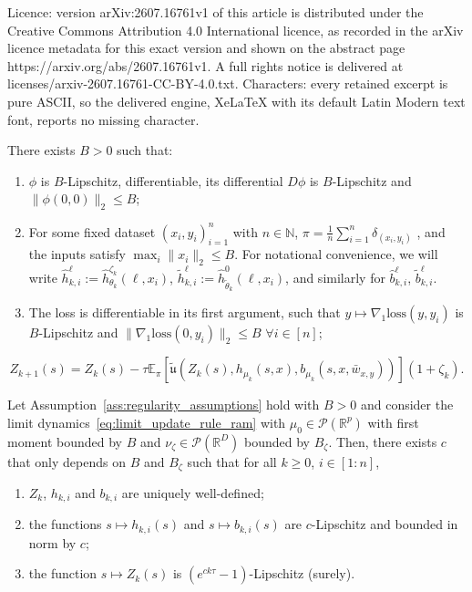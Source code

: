 \documentclass[10pt,a4paper]{amsart}
\newcommand{\E}{\mathbb{E}}
\newcommand{\R}{\mathbb{R}}
\begin{document}
Licence: version arXiv:2607.16761v1 of this article is distributed under the Creative Commons Attribution 4.0 International licence, as recorded in the arXiv licence metadata for this exact version and shown on the abstract page https://arxiv.org/abs/2607.16761v1. A full rights notice is delivered at licenses/arxiv-2607.16761-CC-BY-4.0.txt. Characters: every retained excerpt is pure ASCII, so the delivered engine, XeLaTeX with its default Latin Modern text font, reports no missing character.
\begin{assumption}\label{ass:regularity_assumptions}
    There exists $B > 0$ such that:
\begin{enumerate}
    \item $\phi$ is $B$-Lipschitz, differentiable, its differential $D\phi$ is $B$-Lipschitz and $\|\phi(0,0)\|_2 \le B$;
    \item For some fixed dataset ${(x_i, y_i)}_{i=1}^n$ with $n\in \mathbb{N}$, $\pi = \frac{1}{n}\sum_{i=1}^n \delta_{(x_i, y_i)}$ , and the inputs satisfy $\max_i \|x_i\|_2 \le B$. For notational convenience, we will write \(\hat{h}_{k,i}^\ell := \hat{h}_{\theta_k}^{\zeta_k}(\ell, x_i)\), \(\tilde{h}_{k,i}^\ell := \hat{h}_{\tilde{\theta}_k}^{0}(\ell, x_i)\), and similarly for \(\hat{b}_{k,i}^\ell\), \(\tilde{b}_{k,i}^\ell\).
    \item The loss is differentiable in its first argument, such that $y\mapsto \nabla_1 \mathrm{loss}(y, y_i)$ is $B$-Lipschitz and $\|\nabla_1 \mathrm{loss}(0, y_i)\|_2 \le B$ $\forall i \in [n]$;
\end{enumerate}
\end{assumption}

\begin{equation}\label{eq:limit_update_rule_ram}
  Z_{k+1}(s) = Z_k(s) - \tau \E_{\pi}[\tilde{\mathfrak{u}}(Z_k(s), h_{\mu_k}(s, x), b_{\mu_k}(s, x, \bar{w}_{x,y}))](1+\zeta_k).
\end{equation}

\begin{lemma}\label{lem:propagation_of_regularity}
Let Assumption~\ref{ass:regularity_assumptions} hold with $B > 0$ and consider the limit dynamics~\eqref{eq:limit_update_rule_ram} with $\mu_0 \in \mathcal{P}(\R^p)$ with first moment bounded by $B$ {and $\nu_\zeta \in \mathcal{P}(\R^D)$ bounded by $B_\zeta$}. Then, there exists $c$ that only depends on $B$ {and $B_\zeta$} such that for all $k \geq 0$, $i \in [1:n]$,

\begin{enumerate}
    \item $Z_k$, $h_{k,i}$ and $b_{k,i}$ are uniquely well-defined;
    \item the functions $s \mapsto h_{k,i}(s)$ and $s \mapsto b_{k,i}(s)$ are $c$-Lipschitz and bounded in norm by $c$;
    \item the function $s \mapsto Z_k(s)$ is $(e^{ck\tau} - 1)$-Lipschitz (surely).
\end{enumerate}
\end{lemma}
\end{document}
